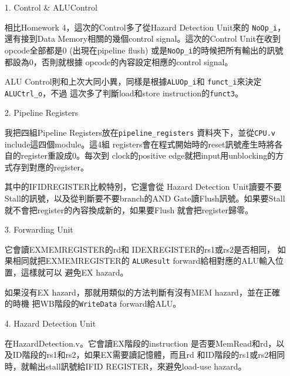 \documentclass{article}
\begin{document}
\begin{enumerate}
    \item[1.] Control \& ALU\textunderscore Control

        相比Homework 4，這次的Control多了從Hazard Detection Unit來的
        \texttt{NoOp_i}，還有接到Data Memory相關的幾個control
        signal。這次的Control Unit在收到opcode全部都是0 (出現在pipeline flush)
        或是\texttt{NoOp_i}的時候把所有輸出的訊號都設為0，否則就根據
        opcode的內容設定相應的control signal。

        ALU Control則和上次大同小異，同樣是根據\texttt{ALUOp_i}和
        \texttt{funct_i}來決定\texttt{ALUCtrl_o}，不過
        這次多了判斷load和store instruction的\texttt{funct3}。

    \item[2.] Pipeline Registers

        我把四組Pipeline Registers放在\texttt{pipeline_registers}
        資料夾下，並從\texttt{CPU.v} include這四個module。這4組
        registers會在程式開始時的reset訊號產生時將各自的register重設成0。每次到
        clock的positive edge就把input用unblocking的方式存到對應的register。

        其中的IF\textunderscore ID\textunderscore REGISTER比較特別，它還會從
        Hazard Detection Unit讀要不要Stall的訊號，以及從判斷要不要branch的AND
        Gate讀Flush訊號。如果要Stall就不會把register的內容換成新的，如果要Flush
        就會把register歸零。

    \item[3.] Forwarding Unit

        它會讀EX\textunderscore MEM\textunderscore REGISTER的rd和
        ID\textunderscore EX\textunderscore REGISTER的rs1或rs2是否相同，
        如果相同就把EX\textunderscore MEM\textunderscore REGISTER的
        \texttt{ALUResult} forward給相對應的ALU輸入位置，這樣就可以
        避免EX hazard。

        如果沒有EX hazard，那就用類似的方法判斷有沒有MEM hazard，並在正確的時機
        把WB階段的\texttt{WriteData} forward給ALU。

    \item[4.] Hazard Detection Unit

        在Hazard\textunderscore Detection.v。它會讀EX階段的instruction
        是否要MemRead和rd，以及ID階段的rs1和rs2，如果EX需要讀記憶體，而且rd
        和ID階段的rs1或rs2相同時，就輸出stall訊號給IF\textunderscore ID
        \textunderscore REGISTER，來避免load-use hazard。


\end{enumerate}
\end{document}
